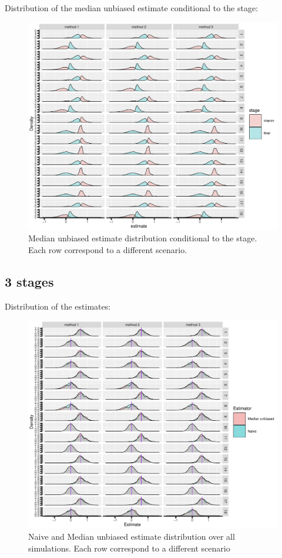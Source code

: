 \documentclass[12pt]{article}
\begin{document}
\clearpage

Distribution of the median unbiased estimate conditional to the stage:
\begin{figure}[!h]
\centering
\includegraphics[trim={0 0 0 0},width=1\textwidth]{./figures/gg2stage-estimateC-density.pdf}
\caption{Median unbiased estimate distribution conditional to the stage. Each row correspond to a different scenario.}
\end{figure}

\clearpage

\subsection{3 stages}
\label{sec:org35ecbfe}

Distribution of the estimates:
\begin{figure}[!h]
\centering
\includegraphics[trim={0 0 0 0},width=1\textwidth]{./figures/gg3stage-estimate-density.pdf}
\caption{Naive and Median unbiased estimate distribution over all simulations. Each row correspond to a different scenario}
\end{figure}
\end{document}
